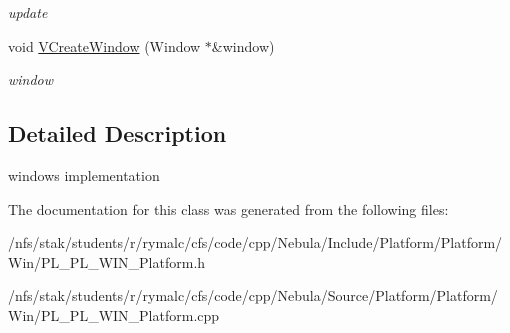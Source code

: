 \begin{DoxyCompactItemize}
\begin{DoxyCompactList}\small\item\em update \item\end{DoxyCompactList}\item 
\hypertarget{classPlatform_1_1PlatformWin_a696343ae7ef18ff2be5bef4ebbd69b38}{
void \hyperlink{classPlatform_1_1PlatformWin_a696343ae7ef18ff2be5bef4ebbd69b38}{VCreateWindow} (Window $\ast$\&window)}
\label{classPlatform_1_1PlatformWin_a696343ae7ef18ff2be5bef4ebbd69b38}

\begin{DoxyCompactList}\small\item\em window \item\end{DoxyCompactList}\end{DoxyCompactItemize}


\subsection{Detailed Description}
windows implementation 

The documentation for this class was generated from the following files:\begin{DoxyCompactItemize}
\item 
/nfs/stak/students/r/rymalc/cfs/code/cpp/Nebula/Include/Platform/Platform/Win/PL\_\-PL\_\-WIN\_\-Platform.h\item 
/nfs/stak/students/r/rymalc/cfs/code/cpp/Nebula/Source/Platform/Platform/Win/PL\_\-PL\_\-WIN\_\-Platform.cpp\end{DoxyCompactItemize}
